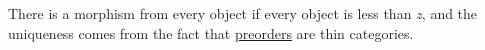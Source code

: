 There is a morphism from every object if every object is less than \emph{z}, and the uniqueness comes from the fact that \href{doc/1 math/Seven Sketches in Compositionality/Chapter 1: Generative Effects/3 Preorders/1 Preorder}{preorders} are thin categories.
